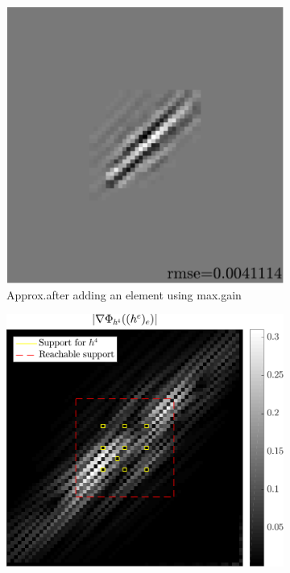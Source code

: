 \begin{figure}[!ht]
\begin{subfigure}[b]{0.28\linewidth}\centering
\includegraphics[width=0.94\linewidth]{figures/before_after/gainafter_approx.pdf}
\caption{Approx.\@ after adding an element using max.\@ gain}\label{fig_beforeafter-aftergainadd-approx}
\end{subfigure}
\begin{subfigure}[b]{0.34\linewidth}\centering
\includegraphics[width=\linewidth]{figures/before_after/gainafter_partgrad4.pdf}

\end{subfigure}
\end{figure}
